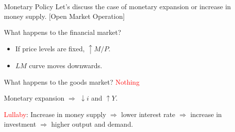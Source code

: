 \documentclass[shownotes,11pt, aspectratio=169]{beamer}
\newenvironment{wideitemize}{\itemize\addtolength{\itemsep}{10pt}}{\enditemize}
\begin{document}
\begin{frame}{Monetary Policy}
Let's discuss the case of monetary expansion or increase in money supply. [Open Market Operation]
\begin{wideitemize}
\item What happens to the financial market?
    \begin{itemize}
    \item If price levels are fixed, $\uparrow M/P$. \pause
    \item $LM$ curve moves downwards. \pause
    \end{itemize}
\item What happens to the goods market? \pause \textcolor{red}{Nothing}  \pause
\item Monetary expansion $\Rightarrow$ $\downarrow i$ and $\uparrow Y$.
\item \textcolor{red}{Lullaby}: Increase in money supply $\Rightarrow$ lower interest rate $\Rightarrow$ increase in investment $\Rightarrow$ higher output and demand. 
\end{wideitemize}
\end{frame}

\begin{frame}
\end{frame}
\end{document}
